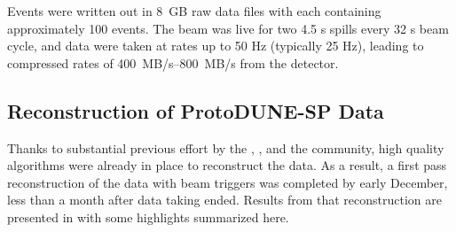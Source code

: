 Events were written out in \SI{8}{GB} raw data files with each containing approximately 100 events. The beam was live for two 4.5 s spills every 32 s beam cycle, and data were taken at  rates up to 50 Hz (typically 25 Hz), leading to compressed  rates of \SIrange{400}{800}{MB/s} from the detector.  

\subsection{Reconstruction of ProtoDUNE-SP Data}
Thanks to substantial previous effort by the , , and the   community, high quality algorithms were already in place to reconstruct the   data.  As a result, a first pass reconstruction of the  data with beam triggers was completed by early December, less than a month after data taking ended.  Results from that reconstruction are presented in \physchtools %
with some highlights summarized here. 



